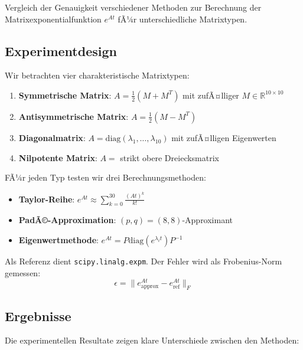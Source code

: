 ﻿\documentclass[a4paper,12pt]{report}
\theoremstyle{definition}
\begin{document}
	Vergleich der Genauigkeit verschiedener Methoden zur Berechnung der Matrixexponentialfunktion $e^{At}$ fÃ¼r unterschiedliche Matrixtypen.
	
	\subsection{Experimentdesign}
	
	Wir betrachten vier charakteristische Matrixtypen:
	
	\begin{enumerate}
		\item \textbf{Symmetrische Matrix}: $A = \frac{1}{2}(M + M^T)$ mit zufÃ¤lliger $M \in \mathbb{R}^{10 \times 10}$
		\item \textbf{Antisymmetrische Matrix}: $A = \frac{1}{2}(M - M^T)$
		\item \textbf{Diagonalmatrix}: $A = \text{diag}(\lambda_1, \ldots, \lambda_{10})$ mit zufÃ¤lligen Eigenwerten
		\item \textbf{Nilpotente Matrix}: $A = $ strikt obere Dreiecksmatrix
	\end{enumerate}
	
	FÃ¼r jeden Typ testen wir drei Berechnungsmethoden:
	
	\begin{itemize}
		\item \textbf{Taylor-Reihe}: $e^{At} \approx \sum_{k=0}^{30} \frac{(At)^k}{k!}$
		\item \textbf{PadÃ©-Approximation}: $(p,q) = (8,8)$-Approximant
		\item \textbf{Eigenwertmethode}: $e^{At} = P \text{diag}(e^{\lambda_i t}) P^{-1}$
	\end{itemize}
	
	Als Referenz dient \texttt{scipy.linalg.expm}. Der Fehler wird als Frobenius-Norm gemessen:
	\[
	\epsilon = \|e^{At}_{\text{approx}} - e^{At}_{\text{ref}}\|_F
	\]
	
	\subsection{Ergebnisse}
	
	Die experimentellen Resultate zeigen klare Unterschiede zwischen den Methoden:
	
\end{document}
